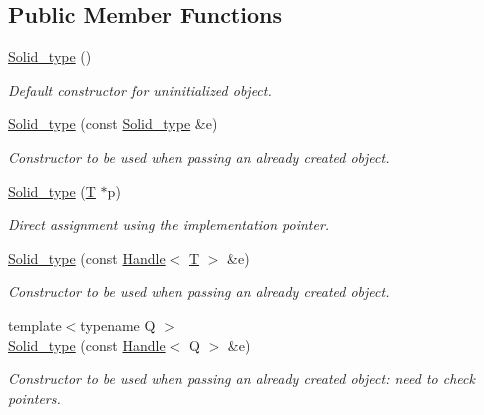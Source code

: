 \subsection*{Public Member Functions}
\begin{DoxyCompactItemize}
\item 
\hyperlink{class_d_d4hep_1_1_geometry_1_1_solid__type_a0a2d2c18f2e6934bbd93f26a13704020}{Solid\_\-type} ()
\begin{DoxyCompactList}\small\item\em Default constructor for uninitialized object. \item\end{DoxyCompactList}\item 
\hyperlink{class_d_d4hep_1_1_geometry_1_1_solid__type_ac4062fddd8f1fb9971577c600e9f7995}{Solid\_\-type} (const \hyperlink{class_d_d4hep_1_1_geometry_1_1_solid__type}{Solid\_\-type} \&e)
\begin{DoxyCompactList}\small\item\em Constructor to be used when passing an already created object. \item\end{DoxyCompactList}\item 
\hyperlink{class_d_d4hep_1_1_geometry_1_1_solid__type_a2788d7317836c7fa98581c4b78d871a7}{Solid\_\-type} (\hyperlink{class_t}{T} $\ast$p)
\begin{DoxyCompactList}\small\item\em Direct assignment using the implementation pointer. \item\end{DoxyCompactList}\item 
\hyperlink{class_d_d4hep_1_1_geometry_1_1_solid__type_a153b1496923f3a094a13bfb57e73a81e}{Solid\_\-type} (const \hyperlink{class_d_d4hep_1_1_handle}{Handle}$<$ \hyperlink{class_t}{T} $>$ \&e)
\begin{DoxyCompactList}\small\item\em Constructor to be used when passing an already created object. \item\end{DoxyCompactList}\item 
{\footnotesize template$<$typename Q $>$ }\\\hyperlink{class_d_d4hep_1_1_geometry_1_1_solid__type_a618f7b1dd4b603b1c619918629d8ba98}{Solid\_\-type} (const \hyperlink{class_d_d4hep_1_1_handle}{Handle}$<$ Q $>$ \&e)
\begin{DoxyCompactList}\small\item\em Constructor to be used when passing an already created object: need to check pointers. \item\end{DoxyCompactList}\item 

\end{DoxyCompactItemize}
